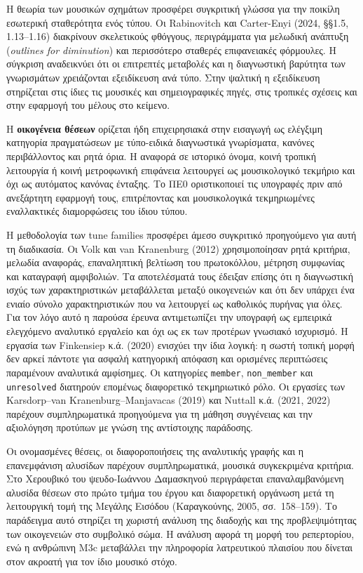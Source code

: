 \documentclass[11pt,a4paper]{article}
\begin{document}
Η θεωρία των μουσικών σχημάτων προσφέρει συγκριτική γλώσσα για την ποικίλη εσωτερική σταθερότητα ενός τύπου. Οι Rabinovitch και Carter-Enyi (2024, §§1.5, 1.13--1.16) διακρίνουν σκελετικούς φθόγγους, περιγράμματα για μελωδική ανάπτυξη (\emph{outlines for diminution}) και περισσότερο σταθερές επιφανειακές φόρμουλες. Η σύγκριση αναδεικνύει ότι οι επιτρεπτές μεταβολές και η διαγνωστική βαρύτητα των γνωρισμάτων χρειάζονται εξειδίκευση ανά τύπο. Στην ψαλτική η εξειδίκευση στηρίζεται στις ίδιες τις μουσικές και σημειογραφικές πηγές, στις τροπικές σχέσεις και στην εφαρμογή του μέλους στο κείμενο.

Η \textbf{οικογένεια θέσεων} ορίζεται ήδη επιχειρησιακά στην εισαγωγή ως ελέγξιμη κατηγορία πραγματώσεων με τύπο-ειδικά διαγνωστικά γνωρίσματα, κανόνες περιβάλλοντος και ρητά όρια. Η αναφορά σε ιστορικό όνομα, κοινή τροπική λειτουργία ή κοινή μετροφωνική επιφάνεια λειτουργεί ως μουσικολογικό τεκμήριο και όχι ως αυτόματος κανόνας ένταξης. Το ΠΕ0 οριστικοποιεί τις υπογραφές πριν από ανεξάρτητη εφαρμογή τους, επιτρέποντας και μουσικολογικά τεκμηριωμένες εναλλακτικές διαμορφώσεις του ίδιου τύπου.

Η μεθοδολογία των tune families προσφέρει άμεσο συγκριτικό προηγούμενο για αυτή τη διαδικασία. Οι Volk και van Kranenburg (2012) χρησιμοποίησαν ρητά κριτήρια, μελωδία αναφοράς, επαναληπτική βελτίωση του πρωτοκόλλου, μέτρηση συμφωνίας και καταγραφή αμφιβολιών. Τα αποτελέσματά τους έδειξαν επίσης ότι η διαγνωστική ισχύς των χαρακτηριστικών μεταβάλλεται μεταξύ οικογενειών και ότι δεν υπάρχει ένα ενιαίο σύνολο χαρακτηριστικών που να λειτουργεί ως καθολικός πυρήνας για όλες. Για τον λόγο αυτό η παρούσα έρευνα αντιμετωπίζει την υπογραφή ως εμπειρικά ελεγχόμενο αναλυτικό εργαλείο και όχι ως εκ των προτέρων γνωσιακό ισχυρισμό. Η εργασία των Finkensiep κ.ά. (2020) ενισχύει την ίδια λογική: η σωστή τοπική μορφή δεν αρκεί πάντοτε για ασφαλή κατηγορική απόφαση και ορισμένες περιπτώσεις παραμένουν αναλυτικά αμφίσημες. Οι κατηγορίες \texttt{member}, \texttt{non\_member} και \texttt{unresolved} διατηρούν επομένως διαφορετικό τεκμηριωτικό ρόλο. Οι εργασίες των Karsdorp--van Kranenburg--Manjavacas (2019) και Nuttall κ.ά. (2021, 2022) παρέχουν συμπληρωματικά προηγούμενα για τη μάθηση συγγένειας και την αξιολόγηση προτύπων με γνώση της αντίστοιχης παράδοσης.


Οι ονομασμένες θέσεις, οι διαφοροποιήσεις της αναλυτικής γραφής και η επανεμφάνιση αλυσίδων παρέχουν συμπληρωματικά, μουσικά συγκεκριμένα κριτήρια. Στο Χερουβικό του ψευδο-Ιωάννου Δαμασκηνού περιγράφεται επαναλαμβανόμενη αλυσίδα θέσεων στο πρώτο τμήμα του έργου και διαφορετική οργάνωση μετά τη λειτουργική τομή της Μεγάλης Εισόδου (Καραγκούνης, 2005, σσ.~158--159). Το παράδειγμα αυτό στηρίζει τη χωριστή ανάλυση της διαδοχής και της προβλεψιμότητας των οικογενειών στο συμβολικό σώμα. Η ανάλυση αφορά τη μορφή του ρεπερτορίου, ενώ η ανθρώπινη M3c μεταβάλλει την πληροφορία λατρευτικού πλαισίου που δίνεται στον ακροατή για τον ίδιο μουσικό στόχο.
\end{document}
